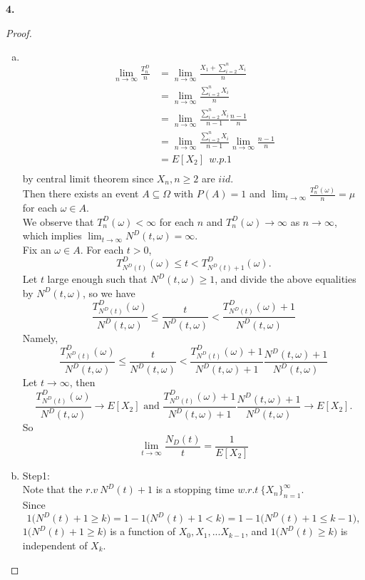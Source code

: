 \documentclass{amsart}
\theoremstyle{plain}
\theoremstyle{definition}
\begin{document}
\noindent \textbf{4.}\\
\begin{proof}
	\begin{enumerate}[(a)]
	\item
	$ $\newline
	\begin{align*}
		\lim_{n \to \infty} \frac{T^D_n}{n} &= \lim_{n\to \infty} \frac{X_1+\sum_{i=2}^{n}X_i}{n}\\ 
									      &= \lim_{n\to \infty} \frac{\sum_{i=2}^{n}X_i}{n} \\
									  	  &= \lim_{n\to \infty} \frac{\sum_{i=2}^{n}X_i}{n-1}\frac{n-1}{n}\\
			 						  	  &= \lim_{n\to \infty} \frac{\sum_{i=2}^{n}X_i}{n-1} \lim_{n\to \infty}\frac{n-1}{n}\\	
							  			  &= E[X_2] \ \ w.p.1\\
	\end{align*}
	by central limit theorem since $X_n, n \geq 2$ are $iid$.\\
	Then there exists an event $A \subseteq \Omega$ with $P(A) = 1$ and $\lim_{t\to \infty}\frac{T^D_n(\omega)}{n} = \mu$ for each $\omega \in A$.\\
	We observe that $T^D_n(\omega) < \infty$ for each $n$ and $T^D_n(\omega) \to \infty$ as $n\to \infty$, which implies $\lim_{t\to \infty}N^D(t,\omega) = \infty$.\\
	Fix an $\omega \in A$. For each $t>0$, 
		\[ T^D_{N^D(t)}(\omega) \leq t < T^D_{N^D(t)+1}(\omega).\]
	Let $t$ large enough such that $N^D(t,\omega) \geq 1$, and divide the above equalities by $N^D(t,\omega)$, so we have 
	\[ \frac{T^D_{N^D(t)}(\omega)}{N^D(t,\omega)} \leq \frac{t}{N^D(t,\omega)} < \frac{T^D_{N^D(t)}(\omega)+1}{N^D(t,\omega)} \]
	Namely,	
	\[ \frac{T^D_{N^D(t)}(\omega)}{N^D(t,\omega)} \leq \frac{t}{N^D(t,\omega)} < \frac{T^D_{N^D(t)}(\omega)+1}{N^D(t,\omega)+1} \frac{{N^D(t,\omega)+1}}{N^D(t,\omega)} \]
	Let $t\to \infty$, then
	\[ \frac{T^D_{N^D(t)}(\omega)}{N^D(t,\omega)} \to E[X_2] \text{ and } \frac{T^D_{N^D(t)}(\omega)+1}{N^D(t,\omega)+1} \frac{{N^D(t,\omega)+1}}{N^D(t,\omega)} \to E[X_2].\]	
	So 
	\[ \lim_{t\to \infty} \frac{N_D(t)}{t} = \frac{1}{E[X_2]} \]
	\item 
	Step1:\\
	Note that the $r.v\ N^D(t)+1$ is a stopping time $w.r.t\ \{X_n\}_{n=1}^{\infty}$.\\
	Since 
	\[ 1\big({N^D(t)+1 \geq k}\big) = 1-1\big({N^D(t)+1 < k}\big) = 1-1\big({N^D(t)+1 \leq k-1}\big), \]
	$1\big({N^D(t)+1 \geq k}\big)$ is a function of $X_0,X_1,...X_{k-1}$, and $1\big({N^D(t) \geq k}\big)$ is independent of $X_k$.\\

\end{enumerate}
\end{proof}
\end{document}
